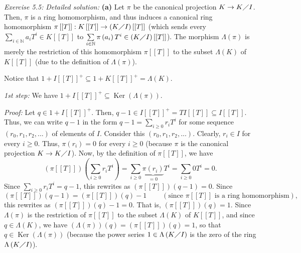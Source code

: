 \documentclass[numbers=enddot,12pt,final,onecolumn,notitlepage]{scrartcl}%
\begin{document}
\textit{Exercise 5.5:} \textit{Detailed solution:} \textbf{(a)} Let $\pi$ be
the canonical projection $K\rightarrow K\diagup I$. Then, $\pi$ is a ring
homomorphism, and thus induces a canonical ring homomorphism $\pi\left[
\left[  T\right]  \right]  :K\left[  \left[  T\right]  \right]  \rightarrow
\left(  K\diagup I\right)  \left[  \left[  T\right]  \right]  $ (which sends
every $\sum\limits_{i\in\mathbb{N}}a_{i}T^{i}\in K\left[  \left[  T\right]
\right]  $ to $\sum\limits_{i\in\mathbb{N}}\pi\left(  a_{i}\right)  T^{i}%
\in\left(  K\diagup I\right)  \left[  \left[  T\right]  \right]  $). The
morphism $\Lambda\left(  \pi\right)  $ is merely the restriction of this
homomorphism $\pi\left[  \left[  T\right]  \right]  $ to the subset
$\Lambda\left(  K\right)  $ of $K\left[  \left[  T\right]  \right]  $ (due to
the definition of $\Lambda\left(  \pi\right)  $).

Notice that $1+I\left[  \left[  T\right]  \right]  ^{+}\subseteq1+K\left[
\left[  T\right]  \right]  ^{+}=\Lambda\left(  K\right)  $.

\textit{1st step:} We have $1+I\left[  \left[  T\right]  \right]
^{+}\subseteq\operatorname*{Ker}\left(  \Lambda\left(  \pi\right)  \right)  $.

\textit{Proof:} Let $q\in1+I\left[  \left[  T\right]  \right]  ^{+}$. Then,
$q-1\in I\left[  \left[  T\right]  \right]  ^{+}=TI\left[  \left[  T\right]
\right]  \subseteq I\left[  \left[  T\right]  \right]  $. Thus, we can write
$q-1$ in the form $q-1=\sum\limits_{i\geq0}r_{i}T^{i}$ for some sequence
$\left(  r_{0},r_{1},r_{2},...\right)  $ of elements of $I$. Consider this
$\left(  r_{0},r_{1},r_{2},...\right)  $. Clearly, $r_{i}\in I$ for every
$i\geq0$. Thus, $\pi\left(  r_{i}\right)  =0$ for every $i\geq0$ (because
$\pi$ is the canonical projection $K\rightarrow K\diagup I$). Now, by the
definition of $\pi\left[  \left[  T\right]  \right]  $, we have%
\[
\left(  \pi\left[  \left[  T\right]  \right]  \right)  \left(  \sum
\limits_{i\geq0}r_{i}T^{i}\right)  =\sum\limits_{i\geq0}\underbrace{\pi\left(
r_{i}\right)  }_{=0}T^{i}=\sum\limits_{i\geq0}0T^{i}=0.
\]
Since $\sum\limits_{i\geq0}r_{i}T^{i}=q-1$, this rewrites as $\left(
\pi\left[  \left[  T\right]  \right]  \right)  \left(  q-1\right)  =0$. Since%
\[
\left(  \pi\left[  \left[  T\right]  \right]  \right)  \left(  q-1\right)
=\left(  \pi\left[  \left[  T\right]  \right]  \right)  \left(  q\right)
-1\ \ \ \ \ \ \ \ \ \ \left(  \text{since }\pi\left[  \left[  T\right]
\right]  \text{ is a ring homomorphism}\right)  ,
\]
this rewrites as $\left(  \pi\left[  \left[  T\right]  \right]  \right)
\left(  q\right)  -1=0$. That is, $\left(  \pi\left[  \left[  T\right]
\right]  \right)  \left(  q\right)  =1$. Since $\Lambda\left(  \pi\right)  $
is the restriction of $\pi\left[  \left[  T\right]  \right]  $ to the subset
$\Lambda\left(  K\right)  $ of $K\left[  \left[  T\right]  \right]  $, and
since $q\in\Lambda\left(  K\right)  $, we have $\left(  \Lambda\left(
\pi\right)  \right)  \left(  q\right)  =\left(  \pi\left[  \left[  T\right]
\right]  \right)  \left(  q\right)  =1$, so that $q\in\operatorname*{Ker}%
\left(  \Lambda\left(  \pi\right)  \right)  $ (because the power series
$1\in\Lambda\left(  K\diagup I\right)  $ is the zero of the ring
$\Lambda\left(  K\diagup I\right)  $).
\end{document}
